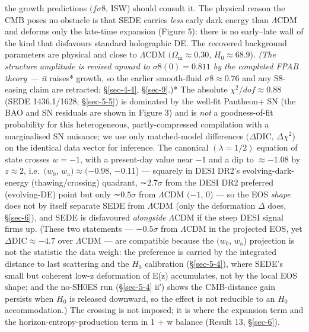 \documentclass[preprint,12pt]{elsarticle}
\begin{document}
the growth predictions \((f\sigma 8\), ISW) should consult it. The
physical reason the CMB poses no obstacle is that SEDE carries
\emph{less} early dark energy than \(\Lambda \mathrm{CDM}\) and deforms
only the late-time expansion (Figure 5): there is no early--late wall of
the kind that disfavours standard holographic DE. The recovered
background parameters are physical and close to \(\Lambda \mathrm{CDM}\)
\((\Omega _{\mathrm{m}} \approx  0.30\), \(H_{0} \approx  68.9\)).
\emph{(The structure amplitude is revised upward to
\(\sigma 8(0) = 0.811\) by the completed FPAB theory --- it }raises*
growth, so the earlier smooth-fluid \(\sigma 8 \approx  0.76\) and any
S8-easing claim are retracted; §\ref{sec-4-4}, §\ref{sec-9}.)* The
absolute \(\chi ^{2}/dof \approx  0.88\) (SEDE 1436.1/1628;
§\ref{sec-5-5}) is dominated by the well-fit Pantheon+ SN (the BAO and
SN residuals are shown in Figure 3) and is \emph{not} a goodness-of-fit
probability for this heterogeneous, partly-compressed compilation with a
marginalised SN nuisance; we use only matched-model differences
\((\Delta \mathrm{DIC}\), \(\Delta \chi ^{2}\)) on the identical data
vector for inference. The canonical \((\lambda  = 1/2)\) equation of
state crosses \(w = -1\), with a present-day value near \(-1\) and a dip
to \(\approx  -1.08\) by \(z \approx  2\), i.e.~\((w_{0}\),
\(w_{\mathrm{a}}) \approx  (-0.98\), −0.11) --- squarely in DESI DR2's
evolving-dark-energy (thawing/crossing) quadrant, ∼\(2.7\sigma\) from
the DESI DR2 preferred (evolving-DE) point but only ∼\(0.5\sigma\) from
\(\Lambda \mathrm{CDM}\) \((-1\), 0) --- so the EOS \emph{shape} does
not by itself separate SEDE from \(\Lambda \mathrm{CDM}\) (only the
deformation \(\Delta\) does, §\ref{sec-6}), and SEDE is disfavoured
\emph{alongside} \(\Lambda \mathrm{CDM}\) if the steep DESI signal firms
up. (These two statements --- ∼\(0.5\sigma\) from
\(\Lambda \mathrm{CDM}\) in the projected EOS, yet
\(\Delta \mathrm{DIC} \approx  -4.7\) over \(\Lambda \mathrm{CDM}\) ---
are compatible because the \((w_{0}\), \(w_{\mathrm{a}}\)) projection is
not the statistic the data weigh: the preference is carried by the
integrated distance to last scattering and the \(H_{0}\) calibration
(§\ref{sec-5-4}), where SEDE's small but coherent low-z deformation of
E(z) accumulates, not by the local EOS shape; and the no-SH0ES run
(§\ref{sec-5-4} ii′) shows the CMB-distance gain persists when \(H_{0}\)
is released downward, so the effect is not reducible to an \(H_{0}\)
accommodation.) The crossing is not imposed; it is where the expansion
term and the horizon-entropy-production term in 1 + w balance (Result
13, §\ref{sec-6}).
\end{document}
